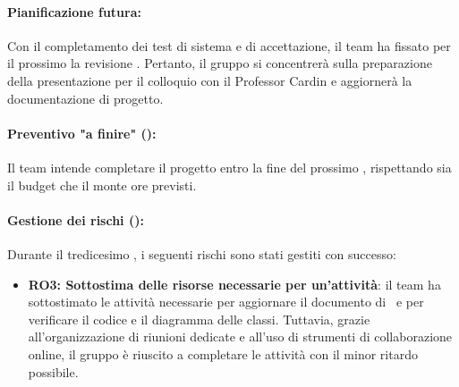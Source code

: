 \paragraph*{Pianificazione futura:}
\par Con il completamento dei test di sistema e di accettazione, il team ha fissato per il prossimo  la revisione . Pertanto, il gruppo si concentrerà sulla preparazione della presentazione per il colloquio con il Professor Cardin e aggiornerà la documentazione di progetto.

\paragraph*{Preventivo "a finire" ():}
\par Il team intende completare il progetto entro la fine del prossimo , rispettando sia il budget che il monte ore previsti.

\paragraph*{Gestione dei rischi ():}
\par Durante il tredicesimo , i seguenti rischi sono stati gestiti con successo:
\begin{itemize}
  \item \textbf{RO3: Sottostima delle risorse necessarie per un'attività}: il team ha sottostimato le attività necessarie per aggiornare il documento di \ST\ e per verificare il codice e il diagramma delle classi. Tuttavia, grazie all'organizzazione di riunioni dedicate e all'uso di strumenti di collaborazione online, il gruppo è riuscito a completare le attività con il minor ritardo possibile.
\end{itemize}

